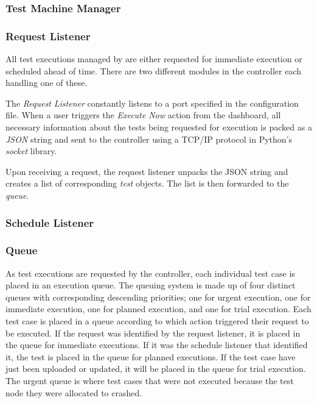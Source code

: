 \subsubsection{Test Machine Manager}


\subsubsection{Request Listener}

All test executions managed by \toolname \space are either requested for immediate execution or scheduled ahead of time. There are two different modules in the controller each handling one of these.

The \emph{Request Listener} constantly listens to a port specified in the configuration file. When a user triggers the \emph{Execute Now} action from the dashboard, all necessary information about the tests being requested for execution is packed as a \emph{JSON} string and sent to the controller using a TCP/IP protocol in Python's \emph{socket} library.

Upon receiving a request, the request listener unpacks the JSON string and creates a list of corresponding \emph{test} objects. The list is then forwarded to the \emph{queue}.


\subsubsection{Schedule Listener}











\subsubsection{Queue}

As test executions are requested by the controller, each individual test case is placed in an execution queue. The queuing system is made up of four distinct queues with corresponding descending priorities; one for urgent execution, one for immediate execution, one for planned execution, and one for trial execution. Each test case is placed in a queue according to which action triggered their request to be executed. If the request was identified by the request listener, it is placed in the queue for immediate executions. If it was the schedule listener that identified it, the test is placed in the queue for planned executions. If the test case have just been uploaded or updated, it will be placed in the queue for trial execution. The urgent queue is where test cases that were not executed because the test node they were allocated to crashed.

